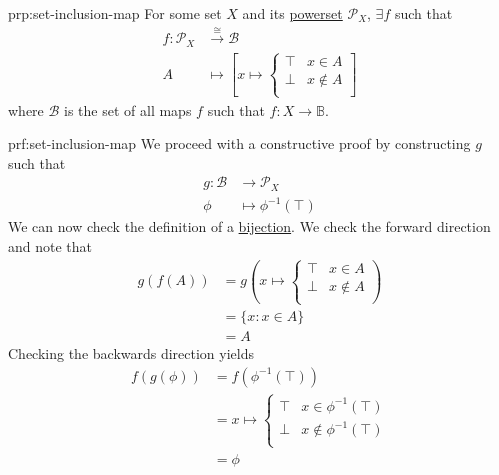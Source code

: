 \begin{prp}{prp:set-inclusion-map}
    For some set \( X \) and its \hyperref[eg:powerset]{powerset} \( \mathcal{P}_{X} \), \( \exists f \) such that
    \begin{align*}
        f : \mathcal{P}_{X} &\xrightarrow{\cong} \mathcal{B} \\
        A &\mapsto
        \left [
            x \mapsto
            \begin{cases}
                \top & x \in A \\
                \bot & x \notin A \\
            \end{cases}
        \right]
    \end{align*}
    where \( \mathcal{B} \) is the set of all maps \( f \) such that \( f : X \to \mathbb{B} \).
\end{prp}

\begin{prf}{prf:set-inclusion-map}
    We proceed with a constructive proof by constructing \( g \) such that
    \begin{align*}
        g : \mathcal{B} &\to \mathcal{P}_{X} \\
        \phi &\mapsto \phi^{-1}(\top)
    \end{align*}
    We can now check the definition of a \hyperref[dfn:bijection]{bijection}.
    We check the forward direction and note that
    \begin{align*}
        g(f(A)) &= g
        \left(
            x \mapsto
            \begin{cases}
                \top & x \in A \\
                \bot & x \notin A \\
            \end{cases}
        \right) \\
        &= \{ x : x \in A \} \\
        &= A
    \end{align*}
    Checking the backwards direction yields
    \begin{align*}
        f(g(\phi)) &= f\left( \phi^{-1}(\top) \right) \\
        &= x \mapsto
            \begin{cases}
                \top & x \in \phi^{-1}(\top) \\
                \bot & x \notin \phi^{-1}(\top) \\
            \end{cases} \\
        &= \phi
    \end{align*}
    \QED{}
\end{prf}
\newpage
